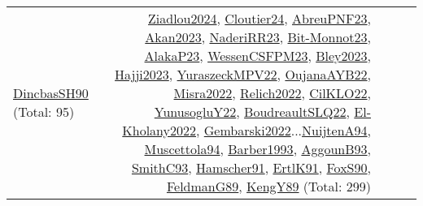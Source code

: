 {\begin{longtable}{p{3cm}r>{\raggedright\arraybackslash}p{6cm}>{\raggedright\arraybackslash}p{6cm}>{\raggedright\arraybackslash}p{8cm}}
\hyperref[detail:DincbasSH90]{DincbasSH90} (Total: 95) & \hyperref[detail:Ziadlou2024]{Ziadlou2024}, \hyperref[detail:Cloutier24]{Cloutier24}, \hyperref[detail:AbreuPNF23]{AbreuPNF23}, \hyperref[detail:Akan2023]{Akan2023}, \hyperref[detail:NaderiRR23]{NaderiRR23}, \hyperref[detail:Bit-Monnot23]{Bit-Monnot23}, \hyperref[detail:AlakaP23]{AlakaP23}, \hyperref[detail:WessenCSFPM23]{WessenCSFPM23}, \hyperref[detail:Bley2023]{Bley2023}, \hyperref[detail:Hajji2023]{Hajji2023}, \hyperref[detail:YuraszeckMPV22]{YuraszeckMPV22}, \hyperref[detail:OujanaAYB22]{OujanaAYB22}, \hyperref[detail:Misra2022]{Misra2022}, \hyperref[detail:Relich2022]{Relich2022}, \hyperref[detail:CilKLO22]{CilKLO22}, \hyperref[detail:YunusogluY22]{YunusogluY22}, \hyperref[detail:BoudreaultSLQ22]{BoudreaultSLQ22}, \hyperref[detail:El-Kholany2022]{El-Kholany2022}, \hyperref[detail:Gembarski2022]{Gembarski2022}...\hyperref[detail:NuijtenA94]{NuijtenA94}, \hyperref[detail:Muscettola94]{Muscettola94}, \hyperref[detail:Barber1993]{Barber1993}, \hyperref[detail:AggounB93]{AggounB93}, \hyperref[detail:SmithC93]{SmithC93}, \hyperref[detail:Hamscher91]{Hamscher91}, \hyperref[detail:ErtlK91]{ErtlK91}, \hyperref[detail:FoxS90]{FoxS90}, \hyperref[detail:FeldmanG89]{FeldmanG89}, \hyperref[detail:KengY89]{KengY89} (Total: 299)\\

\end{longtable}}
